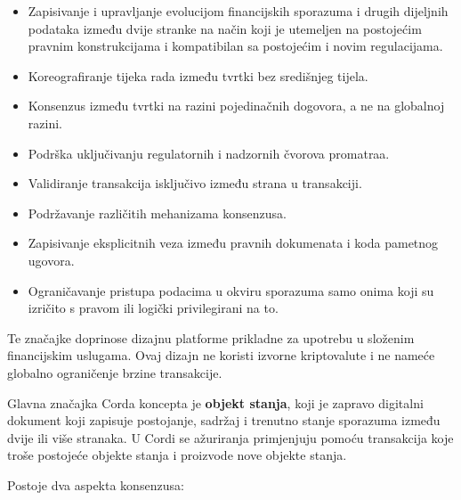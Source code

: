 \documentclass[times, utf8, diplomski]{fer}
\begin{document}
\begin{itemize}

\item Zapisivanje i upravljanje evolucijom financijskih sporazuma i drugih dijeljnih podataka između dvije stranke na način koji je utemeljen na postojećim pravnim konstrukcijama i kompatibilan sa postojećim i novim regulacijama.

\item Koreografiranje tijeka rada između tvrtki bez središnjeg tijela.

\item Konsenzus između tvrtki na razini pojedinačnih dogovora, a ne na globalnoj razini.

\item Podrška uključivanju regulatornih i nadzornih čvorova promatraa.

\item Validiranje transakcija isključivo između strana u transakciji.

\item Podržavanje različitih mehanizama konsenzusa.

\item Zapisivanje eksplicitnih veza između pravnih dokumenata i koda pametnog ugovora.

\item Ograničavanje pristupa podacima u okviru sporazuma samo onima koji su izričito s pravom ili logički privilegirani na to.

\end{itemize}

Te značajke doprinose dizajnu platforme prikladne za upotrebu u složenim  financijskim uslugama. Ovaj dizajn ne koristi izvorne kriptovalute i ne nameće
globalno ograničenje brzine transakcije.

Glavna značajka Corda koncepta je \textbf{objekt stanja}, koji je zapravo digitalni dokument koji zapisuje postojanje, sadržaj i trenutno stanje sporazuma između dvije ili više stranaka. U Cordi se ažuriranja primjenjuju pomoću transakcija koje troše postojeće objekte stanja i proizvode nove objekte stanja. 

Postoje dva aspekta konsenzusa:
\end{document}
